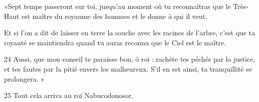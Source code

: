 
«Sept temps passeront sur toi, jusqu’au moment où tu reconnaîtras que le Très-Haut est maître du royaume des hommes et le donne à qui il veut.

Et si l’on a dit de laisser en terre la souche avec les racines de l’arbre, c’est que ta royauté se maintiendra quand tu auras reconnu que le Ciel est le maître.

24 Aussi, que mon conseil te paraisse bon, ô roi : rachète tes péchés par la justice, et tes fautes par la pitié envers les malheureux. S’il en est ainsi, ta tranquillité se prolongera. »

25 Tout cela arriva au roi Nabucodonosor.